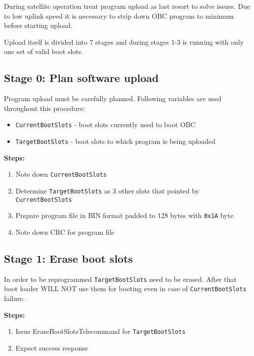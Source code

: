 \newcommand{\currentbs}{\texttt{CurrentBootSlots}}
\newcommand{\targetbs}{\texttt{TargetBootSlots}}




During satellite operation treat program upload as last resort to solve issues. Due to low uplink speed it is necessary to strip down OBC program to minimum before starting upload. 

Upload itself is divided into 7 stages and during stages 1-3 is running with only one set of valid boot slots.

\subsection{Stage 0: Plan software upload}
Program upload must be carefully planned. Following variables are used throughout this procedure:

\begin{itemize}
	\item \currentbs{} - boot slots currently used to boot OBC
	\item \targetbs{} - boot slots to which program is being uploaded
\end{itemize}

\textbf{Steps:}
\begin{enumerate}
	\item Note down \currentbs{}
	\item Determine \targetbs{} as 3 other slots that pointed by \currentbs{}
	\item Prepare program file in BIN format padded to 128 bytes with \texttt{0x1A} byte
	\item Note down CRC for program file
\end{enumerate}

\subsection{Stage 1: Erase boot slots}
In order to be reprogrammed \targetbs{} need to be erased. After that boot loader WILL NOT use them for booting even in case of \currentbs{} failure.


\textbf{Steps:}
\begin{enumerate}
	\item Issue EraseBootSlotsTelecommand for \targetbs{}
	\item Expect success response
\end{enumerate}

